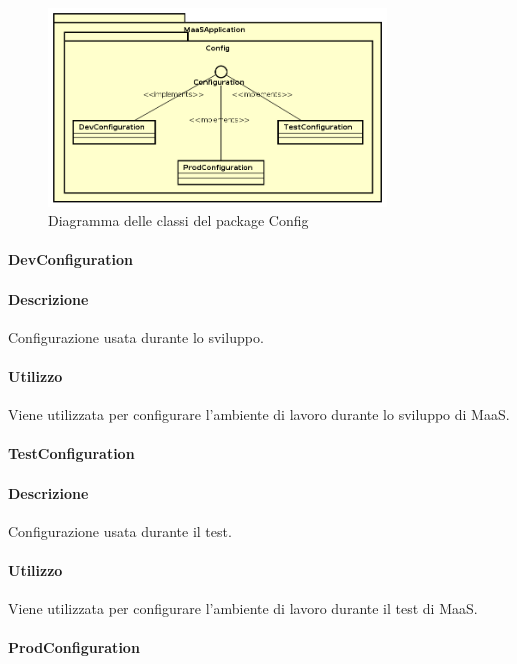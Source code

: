 \begin{figure}[H]
\centering
\includegraphics[width=0.8\textwidth]{res/sections/backend/config.png}
\caption{Diagramma delle classi del package Config}
\end{figure}

\paragraph{DevConfiguration}
\paragraph*{Descrizione}
Configurazione usata durante lo sviluppo.

\paragraph*{Utilizzo}
Viene utilizzata per configurare l'ambiente di lavoro durante lo sviluppo di MaaS.

\paragraph{TestConfiguration}
\paragraph*{Descrizione}
Configurazione usata durante il test.

\paragraph*{Utilizzo}
Viene utilizzata per configurare l'ambiente di lavoro durante il test di MaaS.

\paragraph{ProdConfiguration}
